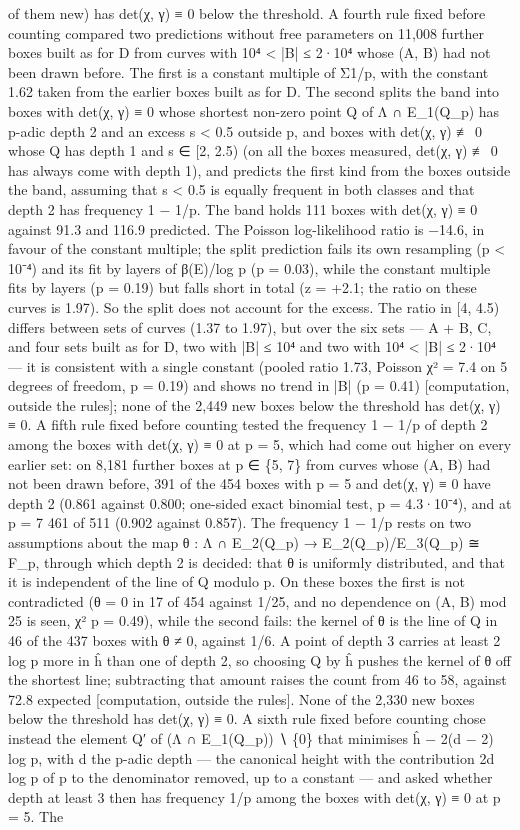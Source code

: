 \documentclass[11pt,a4paper]{article}
\theoremstyle{named}
\begin{document}
of them new) has det(χ, γ) ≡ 0 below the threshold. A fourth rule fixed before counting compared two predictions without free parameters on 11,008 further boxes built as for D from curves with 10⁴ \textless{} |B| ≤ 2·10⁴ whose (A, B) had not been drawn before. The first is a constant multiple of Σ1/p, with the constant 1.62 taken from the earlier boxes built as for D. The second splits the band into boxes with det(χ, γ) ≡ 0 whose shortest non-zero point Q of Λ ∩ E\_1(Q\_p) has p-adic depth 2 and an excess s \textless{} 0.5 outside p, and boxes with det(χ, γ) ≢ 0 whose Q has depth 1 and s ∈ [2, 2.5) (on all the boxes measured, det(χ, γ) ≢ 0 has always come with depth 1), and predicts the first kind from the boxes outside the band, assuming that s \textless{} 0.5 is equally frequent in both classes and that depth 2 has frequency 1 − 1/p. The band holds 111 boxes with det(χ, γ) ≡ 0 against 91.3 and 116.9 predicted. The Poisson log-likelihood ratio is −14.6, in favour of the constant multiple; the split prediction fails its own resampling (p \textless{} 10⁻⁴) and its fit by layers of β(E)/log p (p = 0.03), while the constant multiple fits by layers (p = 0.19) but falls short in total (z = +2.1; the ratio on these curves is 1.97). So the split does not account for the excess. The ratio in [4, 4.5) differs between sets of curves (1.37 to 1.97), but over the six sets — A + B, C, and four sets built as for D, two with |B| ≤ 10⁴ and two with 10⁴ \textless{} |B| ≤ 2·10⁴ — it is consistent with a single constant (pooled ratio 1.73, Poisson χ² = 7.4 on 5 degrees of freedom, p = 0.19) and shows no trend in |B| (p = 0.41) [computation, outside the rules]; none of the 2,449 new boxes below the threshold has det(χ, γ) ≡ 0. A fifth rule fixed before counting tested the frequency 1 − 1/p of depth 2 among the boxes with det(χ, γ) ≡ 0 at p = 5, which had come out higher on every earlier set: on 8,181 further boxes at p ∈ \{5, 7\} from curves whose (A, B) had not been drawn before, 391 of the 454 boxes with p = 5 and det(χ, γ) ≡ 0 have depth 2 (0.861 against 0.800; one-sided exact binomial test, p = 4.3·10⁻⁴), and at p = 7 461 of 511 (0.902 against 0.857). The frequency 1 − 1/p rests on two assumptions about the map θ : Λ ∩ E\_2(Q\_p) → E\_2(Q\_p)/E\_3(Q\_p) ≅ F\_p, through which depth 2 is decided: that θ is uniformly distributed, and that it is independent of the line of Q modulo p. On these boxes the first is not contradicted (θ = 0 in 17 of 454 against 1/25, and no dependence on (A, B) mod 25 is seen, χ² p = 0.49), while the second fails: the kernel of θ is the line of Q in 46 of the 437 boxes with θ ≠ 0, against 1/6. A point of depth 3 carries at least 2 log p more in ĥ than one of depth 2, so choosing Q by ĥ pushes the kernel of θ off the shortest line; subtracting that amount raises the count from 46 to 58, against 72.8 expected [computation, outside the rules]. None of the 2,330 new boxes below the threshold has det(χ, γ) ≡ 0. A sixth rule fixed before counting chose instead the element Q′ of (Λ ∩ E\_1(Q\_p)) ∖ \{0\} that minimises ĥ − 2(d − 2) log p, with d the p-adic depth — the canonical height with the contribution 2d log p of p to the denominator removed, up to a constant — and asked whether depth at least 3 then has frequency 1/p among the boxes with det(χ, γ) ≡ 0 at p = 5. The 
\end{document}

